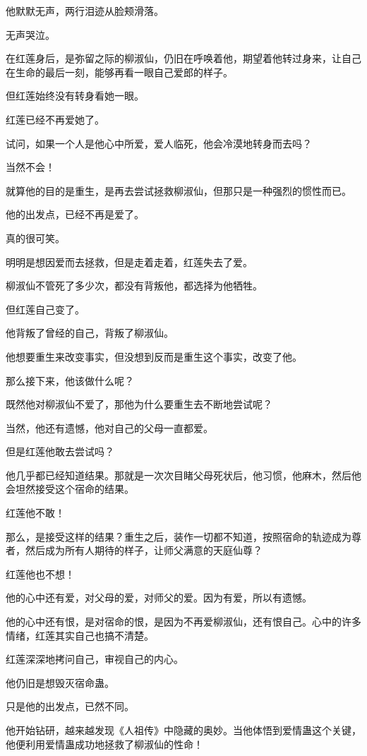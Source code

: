 \begin{this_body}
他默默无声，两行泪迹从脸颊滑落。

无声哭泣。

在红莲身后，是弥留之际的柳淑仙，仍旧在呼唤着他，期望着他转过身来，让自己在生命的最后一刻，能够再看一眼自己爱郎的样子。

但红莲始终没有转身看她一眼。

红莲已经不再爱她了。

试问，如果一个人是他心中所爱，爱人临死，他会冷漠地转身而去吗？

当然不会！

就算他的目的是重生，是再去尝试拯救柳淑仙，但那只是一种强烈的惯性而已。

他的出发点，已经不再是爱了。

真的很可笑。

明明是想因爱而去拯救，但是走着走着，红莲失去了爱。

柳淑仙不管死了多少次，都没有背叛他，都选择为他牺牲。

但红莲自己变了。

他背叛了曾经的自己，背叛了柳淑仙。

他想要重生来改变事实，但没想到反而是重生这个事实，改变了他。

那么接下来，他该做什么呢？

既然他对柳淑仙不爱了，那他为什么要重生去不断地尝试呢？

当然，他还有遗憾，他对自己的父母一直都爱。

但是红莲他敢去尝试吗？

他几乎都已经知道结果。那就是一次次目睹父母死状后，他习惯，他麻木，然后他会坦然接受这个宿命的结果。

红莲他不敢！

那么，是接受这样的结果？重生之后，装作一切都不知道，按照宿命的轨迹成为尊者，然后成为所有人期待的样子，让师父满意的天庭仙尊？

红莲他也不想！

他的心中还有爱，对父母的爱，对师父的爱。因为有爱，所以有遗憾。

他的心中还有恨，是对宿命的恨，是因为不再爱柳淑仙，还有恨自己。心中的许多情绪，红莲其实自己也搞不清楚。

红莲深深地拷问自己，审视自己的内心。

他仍旧是想毁灭宿命蛊。

只是他的出发点，已然不同。

他开始钻研，越来越发现《人祖传》中隐藏的奥妙。当他体悟到爱情蛊这个关键，他便利用爱情蛊成功地拯救了柳淑仙的性命！


\end{this_body}
